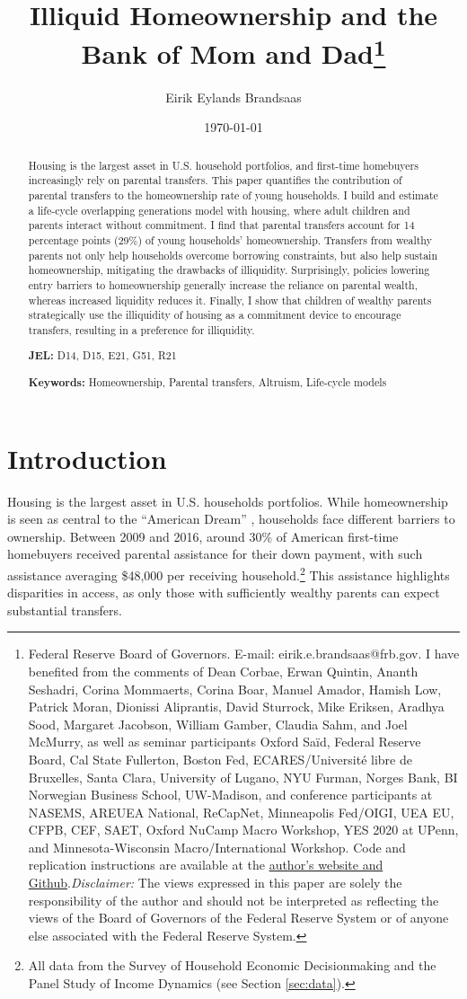 \documentclass[12pt]{article}
\title{{\LARGE Illiquid Homeownership and the \\ Bank of Mom and Dad}\thanks{Federal Reserve Board of Governors. E-mail: eirik.e.brandsaas@frb.gov. I have benefited from the comments of Dean Corbae, Erwan Quintin, Ananth Seshadri, Corina Mommaerts, Corina Boar, Manuel Amador, Hamish Low, Patrick Moran, Dionissi Aliprantis, David Sturrock, Mike Eriksen, Aradhya Sood, Margaret Jacobson, William Gamber, Claudia Sahm, and Joel McMurry, as well as seminar participants Oxford Sa{\"i}d, Federal Reserve Board, Cal State Fullerton, Boston Fed, ECARES/Université libre de Bruxelles, Santa Clara, University of Lugano, NYU Furman, Norges Bank, BI Norwegian Business School, UW-Madison, and conference participants at NASEMS, AREUEA National, ReCapNet, Minneapolis Fed/OIGI, UEA EU, CFPB, CEF, SAET, Oxford NuCamp Macro Workshop, YES 2020 at UPenn, and Minnesota-Wisconsin Macro/International Workshop. Code and replication instructions are available at the \href{https://github.com/eirikbrandsaas/HomeownershipBankMomDad.jl}{author's  website and Github}.\newline \textit{Disclaimer: }The views expressed in this paper are solely the responsibility of the author and should not be interpreted as reflecting the views of the Board of Governors of the Federal Reserve System or of anyone else associated with the Federal Reserve System.}}
\author{Eirik Eylands Brandsaas}
\date{{\today }}
\begin{document}
\maketitle
\begin{abstract}
{\begin{spacing}{1.2}
Housing is the largest asset in U.S. household portfolios, and first-time homebuyers increasingly rely on parental transfers. This paper quantifies the contribution of parental transfers to the homeownership rate of young households. I build and estimate a life-cycle overlapping generations model with housing, where adult children and parents interact without commitment. I find that parental transfers account for 14 percentage points (29\%) of young households' homeownership. Transfers from wealthy parents not only help households overcome borrowing constraints, but also help sustain homeownership, mitigating the drawbacks of illiquidity. Surprisingly, policies lowering entry barriers to homeownership generally increase the reliance on parental wealth, whereas increased liquidity reduces it. Finally, I show that children of wealthy parents strategically use the illiquidity of housing as a commitment device to encourage transfers, resulting in a preference for illiquidity.
\end{spacing}}
\vspace{0.5cm}
\noindent \textbf{JEL:} D14, D15, E21, G51, R21

\noindent \textbf{Keywords:} Homeownership, Parental transfers, Altruism, Life-cycle models

\end{abstract}
\newpage
\onehalfspacing

\section{Introduction}
Housing is the largest asset in U.S. households portfolios. While homeownership is seen as central to the ``American Dream'' \citep{goodman2018homeownership}, households face different barriers to ownership. Between 2009 and 2016, around 30\% of American first-time homebuyers received parental assistance for their down payment, with such assistance averaging \$48,000 per receiving household.\footnote{All data from the Survey of Household Economic Decisionmaking and the Panel Study of Income Dynamics (see Section \ref{sec:data}).} This assistance highlights disparities in access, as only those with sufficiently wealthy parents can expect substantial transfers.
\end{document}
